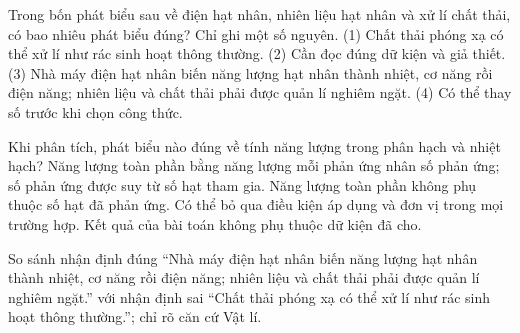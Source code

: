 \begin{ex}
Trong bốn phát biểu sau về điện hạt nhân, nhiên liệu hạt nhân và xử lí chất thải, có bao nhiêu phát biểu đúng? Chỉ ghi một số nguyên. (1) Chất thải phóng xạ có thể xử lí như rác sinh hoạt thông thường. (2) Cần đọc đúng dữ kiện và giả thiết. (3) Nhà máy điện hạt nhân biến năng lượng hạt nhân thành nhiệt, cơ năng rồi điện năng; nhiên liệu và chất thải phải được quản lí nghiêm ngặt. (4) Có thể thay số trước khi chọn công thức.
\end{ex}

\begin{ex}
Khi phân tích, phát biểu nào đúng về tính năng lượng trong phân hạch và nhiệt hạch?
\choice
{\True Năng lượng toàn phần bằng năng lượng mỗi phản ứng nhân số phản ứng; số phản ứng được suy từ số hạt tham gia.}
{Năng lượng toàn phần không phụ thuộc số hạt đã phản ứng.}
{Có thể bỏ qua điều kiện áp dụng và đơn vị trong mọi trường hợp.}
{Kết quả của bài toán không phụ thuộc dữ kiện đã cho.}
\end{ex}

\begin{bt}
So sánh nhận định đúng “Nhà máy điện hạt nhân biến năng lượng hạt nhân thành nhiệt, cơ năng rồi điện năng; nhiên liệu và chất thải phải được quản lí nghiêm ngặt.” với nhận định sai “Chất thải phóng xạ có thể xử lí như rác sinh hoạt thông thường.”; chỉ rõ căn cứ Vật lí.
\end{bt}

